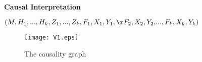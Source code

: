 \documentclass[landscape,dvips,a4]{seminar}
\begin{document}
\begin{slide}
  \begin{center}
    \textbf{\Large Causal Interpretation}
  \end{center}
 \vspace{3mm}
$(M,H_1,...,H_k,Z_1,...,Z_k,F_1,X_1,Y_1,{\r F_2,X_2,Y_2,}...,F_k,X_k,Y_k)$
\begin{figure*}[t]
  \centering





  \texttt{[image: V1.eps]}
  \caption{The causality graph}
  \label{fig:fig2}
\end{figure*}
\end{slide}
\end{document}

